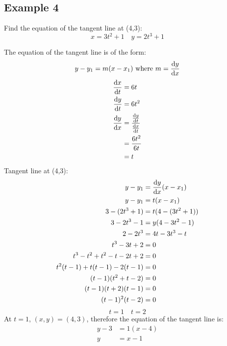 \documentclass{math}
\begin{document}
\subsection*{Example 4}
Find the equation of the tangent line at (4,3):
\[ x = 3t^{2}+1 \quad y = 2t^{3}+1 \]
\begin{center}
\end{center}
The equation of the tangent line is of the form:
\[ y-y_{1}=m(x-x_{1}) \mathrm{\ where\ } m = \frac{\mathrm{d}{y}}{\mathrm{d}{x}} \]
\begin{align*}
  \frac{\mathrm{d}{x}}{\mathrm{d}{t}} &= 6t \\
  \frac{\mathrm{d}{y}}{\mathrm{d}{t}} &= 6t^{2} \\
  \frac{\mathrm{d}{y}}{\mathrm{d}{x}} &=
    \frac{\frac{\mathrm{d}{y}}{\mathrm{d}{t}}}{\frac{\mathrm{d}{x}}{\mathrm{d}{t}}} \\
  &= \frac{6t^{2}}{6t} \\
  &= t
\end{align*}
Tangent line at (4,3):
\begin{align*}
  y-y_{1} &= \frac{\mathrm{d}{y}}{\mathrm{d}{x}}(x-x_{1}) \\
  y-y_{1} &= t(x-x_{1}) \\
  3-(2t^{3}+1) &= t(4-(3t^{2}+1)) \\
  3-2t^{3}-1 &= y(4-3t^{2}-1) \\
  2-2t^{3} &= 4t-3t^{3}-t \\
  t^{3}-3t+2 &= 0 \\
  t^{3}-t^{2}+t^{2}-t-2t+2 &= 0 \\
  t^{2}(t-1)+t(t-1)-2(t-1) &= 0 \\
  (t-1)(t^{2}+t-2) &= 0 \\
  (t-1)(t+2)(t-1) &= 0 \\
  (t-1)^{2}(t-2) &= 0
\end{align*}
\[ t = 1 \quad t = 2 \]
At \( t = 1 \), \( (x, y) = (4,3) \), therefore the equation of the tangent
line is:
\begin{align*}
  y-3 &= 1(x-4) \\
  y &= x - 1
\end{align*}
\end{document}
